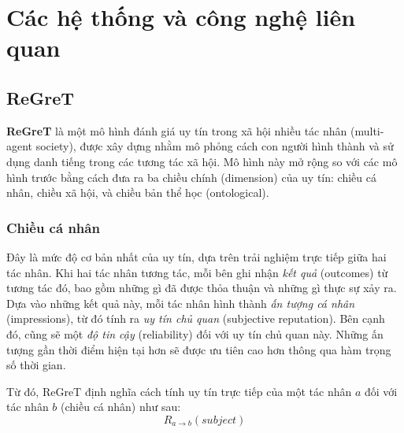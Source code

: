 \chapter{Các hệ thống và công nghệ liên quan}


\section{ReGreT}

\textbf{ReGreT} \cite{regret-reputation-system} là một mô hình đánh giá uy tín trong xã hội nhiều tác nhân (multi-agent society), được xây dựng nhằm mô phỏng cách con người hình thành và sử dụng danh tiếng trong các tương tác xã hội.
Mô hình này mở rộng so với các mô hình trước bằng cách đưa ra ba chiều chính (dimension) của uy tín: chiều cá nhân, chiều xã hội, và chiều bản thể học (ontological).

\subsection{Chiều cá nhân}

Đây là mức độ cơ bản nhất của uy tín, dựa trên trải nghiệm trực tiếp giữa hai tác nhân. Khi hai tác nhân tương tác, mỗi bên ghi nhận \textit{kết quả} (outcomes) từ tương tác đó, bao gồm những gì đã được thỏa thuận và những gì thực sự xảy ra.
Dựa vào những kết quả này, mỗi tác nhân hình thành \textit{ấn tượng cá nhân} (impressions), từ đó tính ra \textit{uy tín chủ quan} (subjective reputation). Bên cạnh đó, cũng sẽ một
\textit{độ tin cậy} (reliability) đối với uy tín chủ quan này. Những ấn tượng gần thời điểm hiện tại hơn sẽ được ưu tiên cao hơn thông qua hàm trọng số thời gian.

Từ đó, ReGreT định nghĩa cách tính uy tín trực tiếp của một tác nhân $a$ đối với tác nhân $b$ (chiều cá nhân) như sau:
\[R_{a \rightarrow b}(subject)\]

